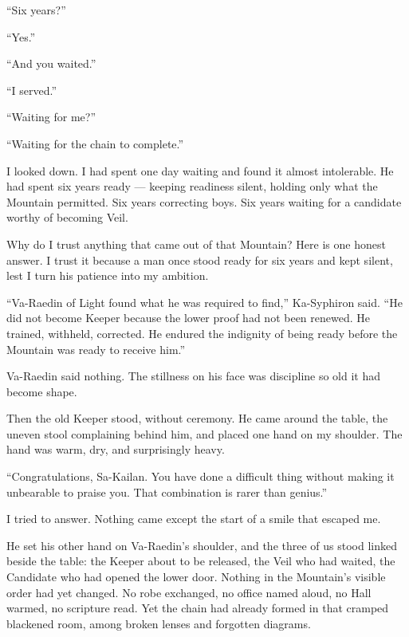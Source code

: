 ``Six years?''\par

``Yes.''\par

``And you waited.''\par

``I served.''\par

``Waiting for me?''\par

``Waiting for the chain to complete.''\par

I looked down.
I had spent one day waiting and found it almost intolerable.
He had spent six years ready --- keeping readiness silent, holding only what the Mountain permitted. Six years correcting boys. Six years waiting for a candidate worthy of becoming Veil.\par

Why do I trust anything that came out of that Mountain? Here is one honest answer.
I trust it because a man once stood ready for six years and kept silent, lest I turn his patience into my ambition.\par

``Va-Raedin of Light found what he was required to find,'' Ka-Syphiron said.
``He did not become Keeper because the lower proof had not been renewed. He trained, withheld, corrected. He endured the indignity of being ready before the Mountain was ready to receive him.''\par

Va-Raedin said nothing.
The stillness on his face was discipline so old it had become shape.\par

Then the old Keeper stood, without ceremony.
He came around the table, the uneven stool complaining behind him, and placed one hand on my shoulder. The hand was warm, dry, and surprisingly heavy.\par

``Congratulations, Sa-Kailan. You have done a difficult thing without making it unbearable to praise you. That combination is rarer than genius.''\par

I tried to answer. Nothing came except the start of a smile that escaped me.\par

He set his other hand on Va-Raedin's shoulder, and the three of us stood linked beside the table: the Keeper about to be released, the Veil who had waited, the Candidate who had opened the lower door.
Nothing in the Mountain's visible order had yet changed. No robe exchanged, no office named aloud, no Hall warmed, no scripture read.
Yet the chain had already formed in that cramped blackened room, among broken lenses and forgotten diagrams.\par

